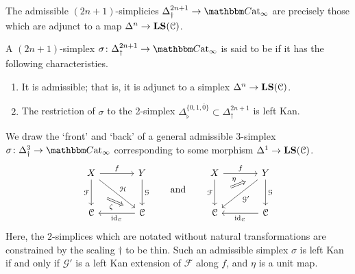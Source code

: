 \documentclass[main.tex]{subfiles}
\begin{document}
\begin{note}
  The admissible $(2n+1)$-simplicies $\Delta^{2n+1}_{\dagger} \to \ICCat$ are precisely those which are adjunct to a map $\Delta^{n} \to \mathbf{LS}(\mathcal{C})$.
\end{note}

\begin{definition}
  \label{def:left_kan_simplex}
  A $(2n+1)$-simplex $\sigma\colon \Delta^{2n+1}_{\dagger} \to \ICCat$ is said to be  if it has the following characteristies.
  \begin{enumerate}
    \item It is admissible; that is, it is adjunct to a simplex $\Delta^{n} \to \mathbf{LS}(\mathcal{C})$.

    \item The restriction of $\sigma$ to the 2-simplex $\Delta^{\{0,1,\overline{0}\}}_{\flat} \subset \Delta^{2n+1}_{\dagger}$ is left Kan.
  \end{enumerate}
\end{definition}

\begin{example}
  \label{eg:left_kan_morphism}
  We draw the `front' and `back' of a general admissible $3$-simplex $\sigma\colon \Delta^{3}_{\dagger} \to \ICCat$ corresponding to some morphism $\Delta^{1} \to \mathbf{LS}(\mathcal{C})$.
  \begin{equation*}
    \begin{tikzcd}[column sep=large, row sep=large]
      X
      \arrow[r, "f"]
      \arrow[d, "\mathcal{F}"{swap}, ""{name=L}]
      \arrow[dr, "\mathcal{H}"]
      & Y
      \arrow[d, "\mathcal{G}"]
      \\
      \category{C}
      & \category{C}
      \arrow[l, "\id_{\category{C}}"]
      \arrow[from=L, Rightarrow, shorten=3ex, "\zeta"{swap}]
    \end{tikzcd}
    \qquad\text{and}\qquad
    \begin{tikzcd}[column sep=large, row sep=large]
      X
      \arrow[r, "f"]
      \arrow[d, "\mathcal{F}"{swap}, ""{name=L}]
      & Y
      \arrow[d, "\mathcal{G}"]
      \arrow[dl, "\mathcal{G}'"]
      \arrow[from=L, Rightarrow, shorten=3ex, "\eta"]
      \\
      \category{C}
      & \category{C}
      \arrow[l, "\id_{\category{C}}"]
    \end{tikzcd}
  \end{equation*}
  Here, the $2$-simplices which are notated without natural transformations are constrained by the scaling $\dagger$ to be thin. Such an admissible simplex $\sigma$ is left Kan if and only if $\mathcal{G}'$ is a left Kan extension of $\mathcal{F}$ along $f$, and $\eta$ is a unit map.
\end{example}
\end{document}
